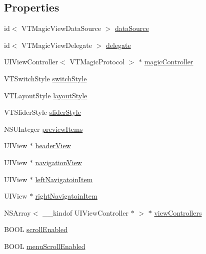 \subsection*{Properties}
\begin{DoxyCompactItemize}
\item 
id$<$ V\+T\+Magic\+View\+Data\+Source $>$ \mbox{\hyperlink{interface_v_t_magic_view_a1fe57f13b73d5a68d19c22c577d5bb14}{data\+Source}}
\item 
id$<$ V\+T\+Magic\+View\+Delegate $>$ \mbox{\hyperlink{interface_v_t_magic_view_abac8496d6d8f7a9f8507898af28cc19c}{delegate}}
\item 
U\+I\+View\+Controller$<$ V\+T\+Magic\+Protocol $>$ $\ast$ \mbox{\hyperlink{interface_v_t_magic_view_a20c3b89341bd7b16009f80b1edc62b0d}{magic\+Controller}}
\item 
V\+T\+Switch\+Style \mbox{\hyperlink{interface_v_t_magic_view_aaffade2151ca95e041b443d9386905be}{switch\+Style}}
\item 
V\+T\+Layout\+Style \mbox{\hyperlink{interface_v_t_magic_view_afa3acaa96b404398cdf1583e1c48af71}{layout\+Style}}
\item 
V\+T\+Slider\+Style \mbox{\hyperlink{interface_v_t_magic_view_a8f831c8a92dfecd3916651ccb55b6c66}{slider\+Style}}
\item 
N\+S\+U\+Integer \mbox{\hyperlink{interface_v_t_magic_view_a1254a06afc4d00304e96abe1f6c80e1c}{preview\+Items}}
\item 
U\+I\+View $\ast$ \mbox{\hyperlink{interface_v_t_magic_view_ad258f0e757efa4340bd6b953249bac4b}{header\+View}}
\item 
U\+I\+View $\ast$ \mbox{\hyperlink{interface_v_t_magic_view_a1bbcfcf72510b534fbcaf1fd4fbada97}{navigation\+View}}
\item 
U\+I\+View $\ast$ \mbox{\hyperlink{interface_v_t_magic_view_a0e735a269794257748316b1fec650636}{left\+Navigatoin\+Item}}
\item 
U\+I\+View $\ast$ \mbox{\hyperlink{interface_v_t_magic_view_a232ba887710d066b5e54f87a522ec7ed}{right\+Navigatoin\+Item}}
\item 
N\+S\+Array$<$ \+\_\+\+\_\+kindof U\+I\+View\+Controller $\ast$ $>$ $\ast$ \mbox{\hyperlink{interface_v_t_magic_view_a9074039c22076a925f7c1274de4464a8}{view\+Controllers}}
\item 
B\+O\+OL \mbox{\hyperlink{interface_v_t_magic_view_a60291309db176600da466958bda834f9}{scroll\+Enabled}}
\item 
B\+O\+OL \mbox{\hyperlink{interface_v_t_magic_view_a4f15aa5610bf387fa0360176d7b0b46b}{menu\+Scroll\+Enabled}}

\end{DoxyCompactItemize}
